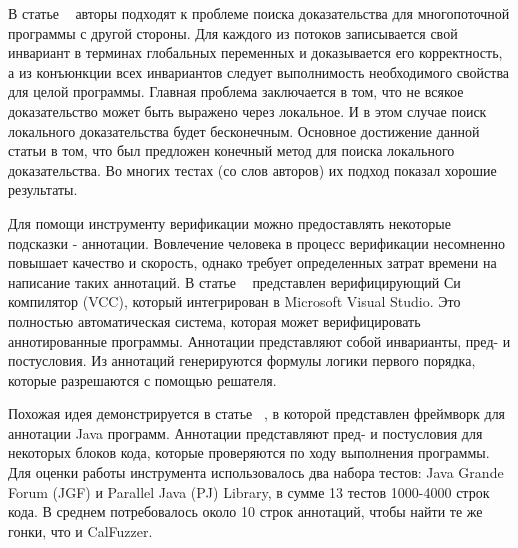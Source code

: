 В статье ~\cite{Cohen:2009} авторы подходят к проблеме поиска доказательства для многопоточной программы с другой стороны. 
Для каждого из потоков записывается свой инвариант в терминах глобальных переменных и доказывается его корректность, а из конъюнкции всех инвариантов следует выполнимость необходимого свойства для целой программы. 
Главная проблема заключается в том, что не всякое доказательство может быть выражено через локальное. И в этом случае поиск локального доказательства будет бесконечным.
Основное достижение данной статьи в том, что был предложен конечный метод для поиска локального доказательства. 
Во многих тестах (со слов авторов) их подход показал хорошие результаты. 

Для помощи инструменту верификации можно предоставлять некоторые подсказки - аннотации. Вовлечение человека в процесс верификации несомненно повышает качество и скорость, однако требует определенных затрат времени на написание таких аннотаций. 
В статье ~\cite{VCC:2009} представлен верифицирующий Си компилятор (VCC), который интегрирован в Microsoft Visual Studio. Это полностью автоматическая система, которая может верифицировать аннотированные программы. Аннотации представляют собой инварианты, пред- и постусловия. Из аннотаций генерируются формулы логики первого порядка, которые разрешаются с помощью решателя.

Похожая идея демонстрируется в статье ~\cite{Burnim:2009}, в которой представлен фреймворк для аннотации Java программ. Аннотации представляют пред- и постусловия для некоторых блоков кода, которые проверяются по ходу выполнения программы. 
Для оценки работы инструмента использовалось два набора тестов: Java Grande Forum (JGF) и Parallel Java (PJ) Library, в сумме 13 тестов 1000-4000 строк кода. В среднем потребовалось около 10 строк аннотаций, чтобы найти те же гонки, что и CalFuzzer. 

